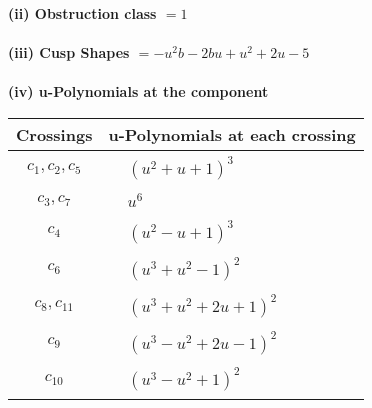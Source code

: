 \documentclass[1p]{elsarticle_modified}
\theoremstyle{definition}
\begin{document}
\flushleft \textbf{(ii) Obstruction class $= 1$}\\~\\
\flushleft \textbf{(iii) Cusp Shapes $= - u^2 b-2 b u+u^2+2 u-5$}\\~\\
\newpage\renewcommand{\arraystretch}{1}
\flushleft \textbf{(iv) u-Polynomials at the component}\newline \\
\begin{tabular}{m{50pt}|m{274pt}}
Crossings & \hspace{64pt}u-Polynomials at each crossing \\
\hline $$\begin{aligned}c_{1},c_{2},c_{5}\end{aligned}$$&$\begin{aligned}
&(u^2+u+1)^3
\end{aligned}$\\
\hline $$\begin{aligned}c_{3},c_{7}\end{aligned}$$&$\begin{aligned}
&u^6
\end{aligned}$\\
\hline $$\begin{aligned}c_{4}\end{aligned}$$&$\begin{aligned}
&(u^2- u+1)^3
\end{aligned}$\\
\hline $$\begin{aligned}c_{6}\end{aligned}$$&$\begin{aligned}
&(u^3+u^2-1)^2
\end{aligned}$\\
\hline $$\begin{aligned}c_{8},c_{11}\end{aligned}$$&$\begin{aligned}
&(u^3+u^2+2 u+1)^2
\end{aligned}$\\
\hline $$\begin{aligned}c_{9}\end{aligned}$$&$\begin{aligned}
&(u^3- u^2+2 u-1)^2
\end{aligned}$\\
\hline $$\begin{aligned}c_{10}\end{aligned}$$&$\begin{aligned}
&(u^3- u^2+1)^2
\end{aligned}$\\
\hline
\end{tabular}\\~\\
\end{document}
